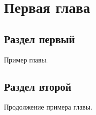 \chapter{Первая глава}

\section{Раздел первый}

Пример главы.

\section{Раздел второй}

Продолжение примера главы.
